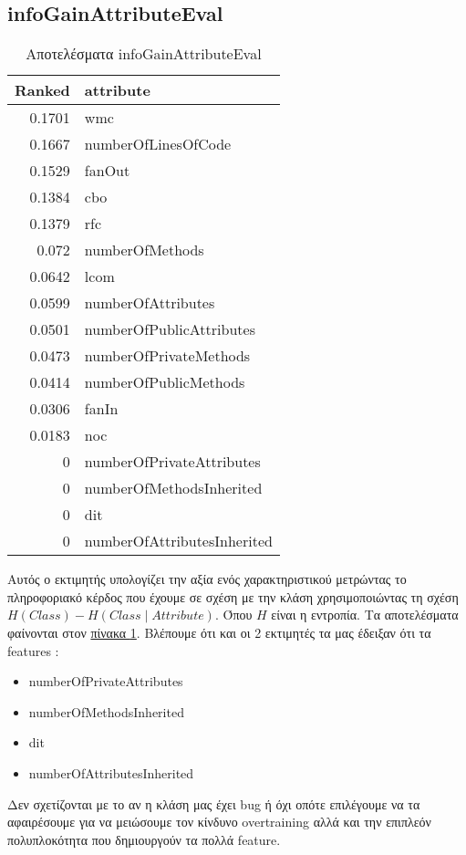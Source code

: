 \subsection{infoGainAttributeΕval}
\begin{table}[tbh]
\centering
\begin{tabular}{r|l}
Ranked & attribute\\
\hline
0.1701 &  wmc\\
0.1667&   numberOfLinesOfCode\\
0.1529&   fanOut\\
0.1384&   cbo\\
0.1379&   rfc\\
0.072 &  numberOfMethods\\
0.0642&   lcom\\
0.0599&   numberOfAttributes\\
0.0501&   numberOfPublicAttributes\\
0.0473&  numberOfPrivateMethods\\
0.0414&   numberOfPublicMethods\\
0.0306&   fanIn\\
0.0183&   noc\\
0      &  numberOfPrivateAttributes\\
0      &  numberOfMethodsInherited\\
0      &  dit\\
0      &  numberOfAttributesInherited\\
\end{tabular}
\caption{Αποτελέσματα infoGainAttributeΕval}
\label{table:infoGainAttributeΕval}
\end{table}

Αυτός ο εκτιμητής υπολογίζει την αξία ενός χαρακτηριστικού μετρώντας το πληροφοριακό κέρδος που έχουμε σε σχέση με την κλάση χρησιμοποιώντας τη σχέση $H(Class) - H(Class \mid Attribute)$.
Όπου $H$ είναι η εντροπία.
Τα αποτελέσματα φαίνονται στον
\hyperref[table:infoGainAttributeΕval]{πίνακα \ref{table:infoGainAttributeΕval}}.
\FloatBarrier
Βλέπουμε ότι και οι 2 εκτιμητές τα μας έδειξαν ότι τα features :
\begin{itemize}
\bfseries
\item numberOfPrivateAttributes
\item numberOfMethodsInherited
\item dit
\item numberOfAttributesInherited 
\end{itemize}
Δεν σχετίζονται με το αν η κλάση μας έχει bug ή όχι οπότε επιλέγουμε να τα αφαιρέσουμε
για να μειώσουμε τον κίνδυνο overtraining αλλά και την επιπλεόν πολυπλοκότητα που δημιουργούν τα πολλά feature.

